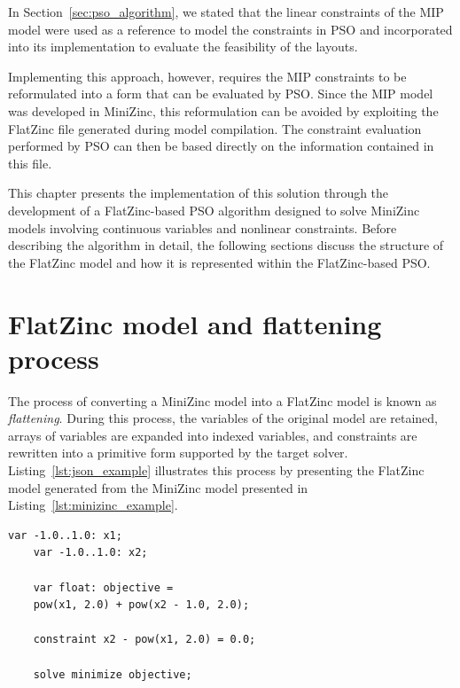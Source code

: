 \label{chap:pt1_chapter7}

In Section~\ref{sec:pso_algorithm}, we stated that the linear constraints of the MIP model were used as a reference to model the constraints in PSO and incorporated into its implementation to evaluate the feasibility of the layouts. 

Implementing this approach, however, requires the MIP constraints to be reformulated into a form that can be evaluated by PSO. Since the MIP model was developed in MiniZinc, this reformulation can be avoided by exploiting the FlatZinc file generated during model compilation. The constraint evaluation performed by PSO can then be based directly on the information contained in this file.

This chapter presents the implementation of this solution through the development of a FlatZinc-based PSO algorithm designed to solve MiniZinc models involving continuous variables and nonlinear constraints. Before describing the algorithm in detail, the following sections discuss the structure of the FlatZinc model and how it is represented within the FlatZinc-based PSO.


\section{FlatZinc model and flattening process}
\label{sec:flattening}

The process of converting a MiniZinc model into a FlatZinc model is known as \emph{flattening}. During this process, the variables of the original model are retained, arrays of variables are expanded into indexed variables, and constraints are rewritten into a primitive form supported by the target solver. Listing~\ref{lst:json_example} illustrates this process by presenting the FlatZinc model generated from the MiniZinc model presented in Listing~\ref{lst:minizinc_example}.

\begin{lstlisting}[language=MiniZinc, caption={Example of MiniZinc model}, label={lst:minizinc_example}]
	var -1.0..1.0: x1;
	var -1.0..1.0: x2;
	
	var float: objective =
	pow(x1, 2.0) + pow(x2 - 1.0, 2.0);
	
	constraint x2 - pow(x1, 2.0) = 0.0;
	
	solve minimize objective;
\end{lstlisting}

